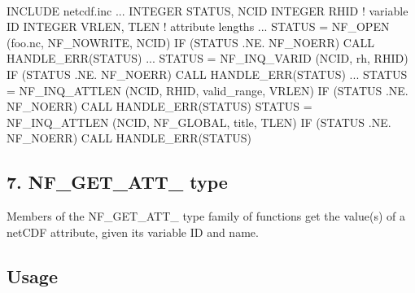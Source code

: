  

I\+N\+C\+L\+U\+DE \textquotesingle{}netcdf.\+inc\textquotesingle{} ... I\+N\+T\+E\+G\+ER S\+T\+A\+T\+US, N\+C\+ID I\+N\+T\+E\+G\+ER R\+H\+ID ! variable ID I\+N\+T\+E\+G\+ER V\+R\+L\+EN, T\+L\+EN ! attribute lengths ... S\+T\+A\+T\+US = N\+F\+\_\+\+O\+P\+EN (\textquotesingle{}foo.\+nc\textquotesingle{}, N\+F\+\_\+\+N\+O\+W\+R\+I\+TE, N\+C\+ID) IF (S\+T\+A\+T\+US .NE. N\+F\+\_\+\+N\+O\+E\+RR) C\+A\+LL H\+A\+N\+D\+L\+E\+\_\+\+E\+R\+R(\+S\+T\+A\+T\+U\+S) ... S\+T\+A\+T\+US = N\+F\+\_\+\+I\+N\+Q\+\_\+\+V\+A\+R\+ID (N\+C\+ID, \textquotesingle{}rh\textquotesingle{}, R\+H\+ID) IF (S\+T\+A\+T\+US .NE. N\+F\+\_\+\+N\+O\+E\+RR) C\+A\+LL H\+A\+N\+D\+L\+E\+\_\+\+E\+R\+R(\+S\+T\+A\+T\+U\+S) ... S\+T\+A\+T\+US = N\+F\+\_\+\+I\+N\+Q\+\_\+\+A\+T\+T\+L\+EN (N\+C\+ID, R\+H\+ID, \textquotesingle{}valid\+\_\+range\textquotesingle{}, V\+R\+L\+EN) IF (S\+T\+A\+T\+US .NE. N\+F\+\_\+\+N\+O\+E\+RR) C\+A\+LL H\+A\+N\+D\+L\+E\+\_\+\+E\+R\+R(\+S\+T\+A\+T\+U\+S) S\+T\+A\+T\+US = N\+F\+\_\+\+I\+N\+Q\+\_\+\+A\+T\+T\+L\+EN (N\+C\+ID, N\+F\+\_\+\+G\+L\+O\+B\+AL, \textquotesingle{}title\textquotesingle{}, T\+L\+EN) IF (S\+T\+A\+T\+US .NE. N\+F\+\_\+\+N\+O\+E\+RR) C\+A\+LL H\+A\+N\+D\+L\+E\+\_\+\+E\+R\+R(\+S\+T\+A\+T\+U\+S)

\subsection*{7. N\+F\+\_\+\+G\+E\+T\+\_\+\+A\+T\+T\+\_\+ type }

Members of the N\+F\+\_\+\+G\+E\+T\+\_\+\+A\+T\+T\+\_\+ type family of functions get the value(s) of a net\+C\+DF attribute, given its variable ID and name.

\subsection*{Usage }

 


